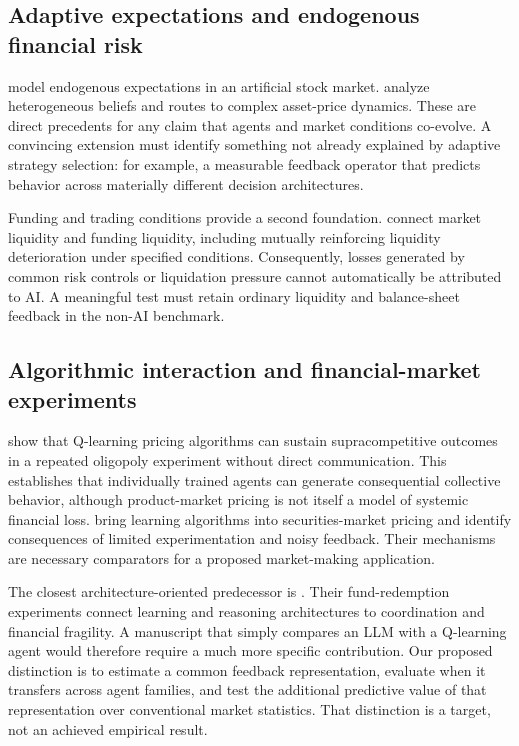 \documentclass[11pt,a4paper]{article}
\theoremstyle{definition}
\theoremstyle{remark}
\begin{document}
\subsection{Adaptive expectations and endogenous financial risk}
\citet{arthur1996} model endogenous expectations in an artificial stock market. \citet{brock1998} analyze heterogeneous beliefs and routes to complex asset-price dynamics. These are direct precedents for any claim that agents and market conditions co-evolve. A convincing extension must identify something not already explained by adaptive strategy selection: for example, a measurable feedback operator that predicts behavior across materially different decision architectures.

Funding and trading conditions provide a second foundation. \citet{brunnermeier2009} connect market liquidity and funding liquidity, including mutually reinforcing liquidity deterioration under specified conditions. Consequently, losses generated by common risk controls or liquidation pressure cannot automatically be attributed to AI. A meaningful test must retain ordinary liquidity and balance-sheet feedback in the non-AI benchmark.

\subsection{Algorithmic interaction and financial-market experiments}
\citet{calvano2020} show that Q-learning pricing algorithms can sustain supracompetitive outcomes in a repeated oligopoly experiment without direct communication. This establishes that individually trained agents can generate consequential collective behavior, although product-market pricing is not itself a model of systemic financial loss. \citet{colliard2026} bring learning algorithms into securities-market pricing and identify consequences of limited experimentation and noisy feedback. Their mechanisms are necessary comparators for a proposed market-making application.

The closest architecture-oriented predecessor is \citet{anand2026}. Their fund-redemption experiments connect learning and reasoning architectures to coordination and financial fragility. A manuscript that simply compares an LLM with a Q-learning agent would therefore require a much more specific contribution. Our proposed distinction is to estimate a common feedback representation, evaluate when it transfers across agent families, and test the additional predictive value of that representation over conventional market statistics. That distinction is a target, not an achieved empirical result.
\end{document}
